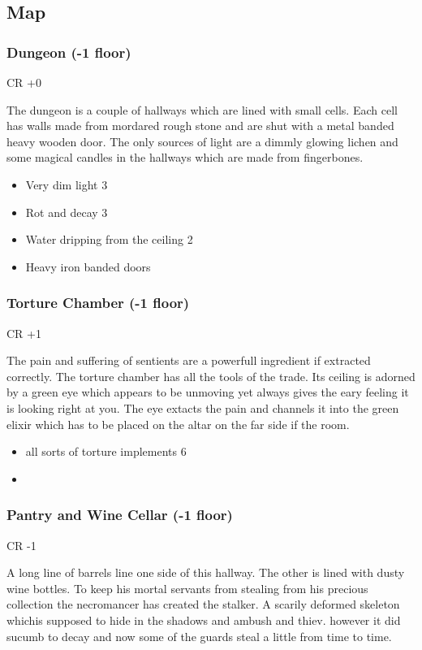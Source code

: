 \documentclass[11pt]{article}
\begin{document}
{\subsection{Map}
\label{sec:org01840f2}

\subsubsection{Dungeon (-1 floor)}
\label{sec:org85de5c6}
CR +0

The dungeon is a couple of hallways which are lined with small cells. Each cell has walls made from mordared rough stone and are shut with a metal banded heavy wooden door. The only sources of light are a dimmly glowing lichen and some magical candles in the hallways which are made from fingerbones.

\begin{itemize}
\item Very dim light 3
\item Rot and decay 3
\item Water dripping from the ceiling 2
\item Heavy iron banded doors
\end{itemize}
\subsubsection{Torture Chamber (-1 floor)}
\label{sec:org9833740}
CR +1

The pain and suffering of sentients are a powerfull ingredient if extracted correctly. The torture chamber has all the tools of the trade. Its ceiling is adorned by a green eye which appears to be unmoving yet always gives the eary feeling it is looking right at you. The eye extacts the pain and channels it into the green elixir which has to be placed on the altar on the far side if the room.

\begin{itemize}
\item all sorts of torture implements 6
\item 
\end{itemize}
\subsubsection{Pantry and Wine Cellar (-1 floor)}
\label{sec:org540eb1d}
CR -1

A long line of barrels line one side of this hallway. The other is lined with dusty wine bottles. To keep his mortal servants from stealing from his precious collection the necromancer has created the stalker. A scarily deformed skeleton whichis supposed to hide in the shadows and ambush and thiev. however it did sucumb to decay and now some of the guards steal a little from time to time.

}
\end{document}
